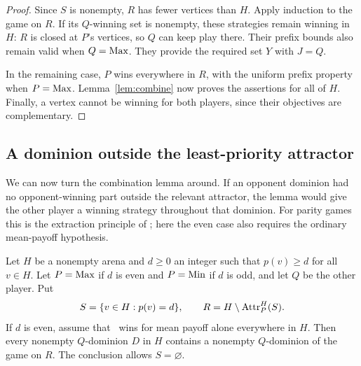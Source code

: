 \begin{proof}
Since $S$ is nonempty, $R$ has fewer vertices than $H$.  Apply induction
to the game on $R$.  If its $Q$-winning set is nonempty, these strategies
remain winning in $H$: $R$ is closed at $P$'s vertices, so $Q$ can keep
play there.  Their prefix bounds also remain valid when $Q=\mathrm{Max}$.
They provide the required set $Y$ with $J=Q$.

In the remaining case, $P$ wins everywhere in $R$, with the uniform
prefix property when $P=\mathrm{Max}$.  Lemma~\ref{lem:combine} now proves the
assertions for all of $H$.  Finally, a vertex cannot be winning for both
players, since their objectives are complementary.
\end{proof}

\subsection{A dominion outside the least-priority attractor}

We can now turn the combination lemma around.  If an opponent dominion
had no opponent-winning part outside the relevant attractor, the lemma
would give the other player a winning strategy throughout that dominion.
For parity games this is the extraction principle of
\cite[Lemma~2.3]{LehtinenParysScheweWojtczak2022}; here the even case
also requires the ordinary mean-payoff hypothesis.

\begin{lemma}
\label{lem:extract}
Let $H$ be a nonempty arena and $d\geq0$ an integer such that
$p(v)\geq d$ for all $v\in H$.  Let $P=\mathrm{Max}$ if $d$ is even and
$P=\mathrm{Min}$ if $d$ is odd, and let $Q$ be the other player.  Put
\[
 S=\{v\in H:p(v)=d\},\qquad
 R=H\setminus\operatorname{Attr}_P^H(S).
\]
If $d$ is even, assume that \Max\ wins for mean payoff alone everywhere
in $H$.  Then every nonempty $Q$-dominion $D$ in $H$ contains a nonempty
$Q$-dominion of the game on $R$.  The conclusion allows
$S=\varnothing$.
\end{lemma}

